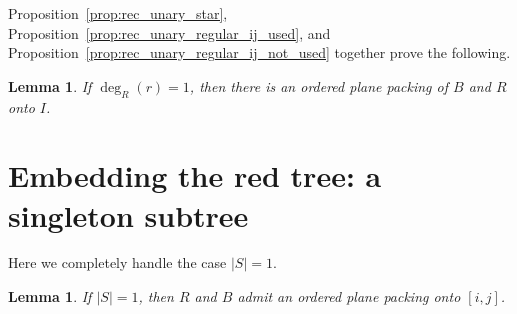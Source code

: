 \documentclass[11pt,a4paper,colorlinks=true,urlcolor=blue,citecolor=red]{article}
\theoremstyle{plain}
\newtheorem{lemma}[theorem]{Lemma}
\begin{document}
Proposition~\ref{prop:rec_unary_star},
Proposition~\ref{prop:rec_unary_regular_ij_used}, and
Proposition~\ref{prop:rec_unary_regular_ij_not_used} together prove the
following.

\begin{lemma}
  \label{lem:rec_unary}
  If $\deg_R(r)=1$, then there is an ordered plane packing of $B$ and
  $R$ onto $I$.
\end{lemma}

\section{Embedding the red tree: a singleton subtree}
\label{subsec:rec_singleton}
Here we completely handle the case $|S|=1$.

\begin{lemma}\label{lem:rec_singleton}
  If $|S|=1$, then $R$ and $B$ admit an ordered plane packing onto
  $[i,j]$.
\end{lemma}
\end{document}
